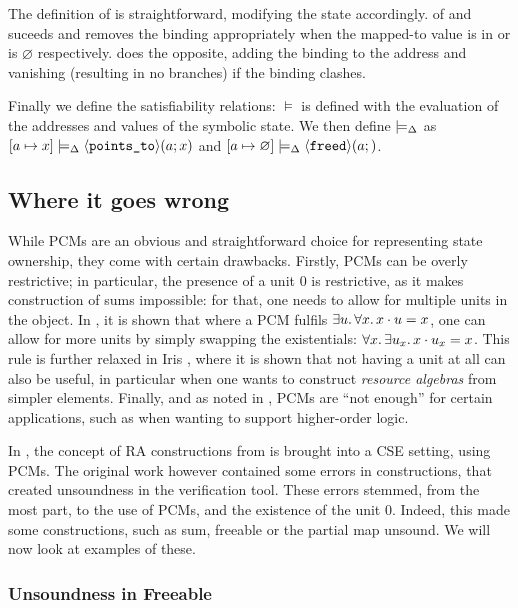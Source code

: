  The definition of \execac{} is straightforward, modifying the state accordingly. \consume{} of \pointsto{} and \freedP{} suceeds and removes the binding appropriately when the mapped-to value is in \LVal{} or is $\varnothing$ respectively. \produce{} does the opposite, adding the binding to the address and vanishing (resulting in no branches) if the binding clashes.

 Finally we define the satisfiability relations: $\models$ is defined with the evaluation of the addresses and values of the symbolic state. We then define $\models_{\Delta}$ as ${[a\mapsto x]\models_{\Delta} \left<\texttt{points\_to}\right>\!(a;x)}$ and ${[a\mapsto\varnothing]\models_{\Delta}\left<\texttt{freed}\right>\!(a;)}$.

\subsection{Where it goes wrong}

While PCMs are an obvious and straightforward choice for representing state ownership, they come with certain drawbacks. Firstly, PCMs can be overly restrictive; in particular, the presence of a unit $0$ is restrictive, as it makes construction of sums impossible: for that, one needs to allow for multiple units in the object. In \cite{sepalgebra}, it is shown that where a PCM fulfils $\exists u\ldotp \forall x\ldotp x\cdot u = x$, one can allow for more units by simply swapping the existentials: $\forall x\ldotp \exists u_x\ldotp x \cdot u_x = x$. This rule is further relaxed in Iris \cite{iris}, where it is shown that not having a unit at all can also be useful, in particular when one wants to construct \emph{resource algebras} from simpler elements. Finally, and as noted in \cite{iris}, PCMs are ``not enough'' for certain applications, such as when wanting to support higher-order logic.

In \cite{sacha-phd}, the concept of RA constructions from \cite{iris} is brought into a CSE setting, using PCMs. The original work however contained some errors in constructions, that created unsoundness in the verification tool. These errors stemmed, from the most part, to the use of PCMs, and the existence of the unit $0$. Indeed, this made some constructions, such as sum, freeable or the partial map unsound. We will now look at examples of these.

\subsubsection{Unsoundness in Freeable}

